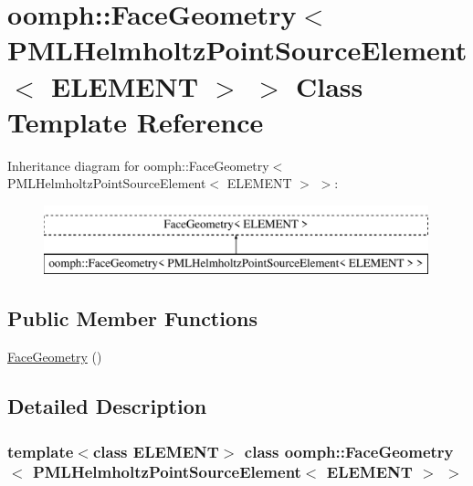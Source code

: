\hypertarget{classoomph_1_1FaceGeometry_3_01PMLHelmholtzPointSourceElement_3_01ELEMENT_01_4_01_4}{}\section{oomph\+:\+:Face\+Geometry$<$ P\+M\+L\+Helmholtz\+Point\+Source\+Element$<$ E\+L\+E\+M\+E\+NT $>$ $>$ Class Template Reference}
\label{classoomph_1_1FaceGeometry_3_01PMLHelmholtzPointSourceElement_3_01ELEMENT_01_4_01_4}
Inheritance diagram for oomph\+:\+:Face\+Geometry$<$ P\+M\+L\+Helmholtz\+Point\+Source\+Element$<$ E\+L\+E\+M\+E\+NT $>$ $>$\+:\begin{figure}[H]
\begin{center}
\leavevmode
\includegraphics[height=2.000000cm]{classoomph_1_1FaceGeometry_3_01PMLHelmholtzPointSourceElement_3_01ELEMENT_01_4_01_4}
\end{center}
\end{figure}
\subsection*{Public Member Functions}
\begin{DoxyCompactItemize}
\item 
\hyperlink{classoomph_1_1FaceGeometry_3_01PMLHelmholtzPointSourceElement_3_01ELEMENT_01_4_01_4_abf99f385b7c32969fdef43209e14ce79}{Face\+Geometry} ()
\end{DoxyCompactItemize}


\subsection{Detailed Description}
\subsubsection*{template$<$class E\+L\+E\+M\+E\+NT$>$\newline
class oomph\+::\+Face\+Geometry$<$ P\+M\+L\+Helmholtz\+Point\+Source\+Element$<$ E\+L\+E\+M\+E\+N\+T $>$ $>$}

